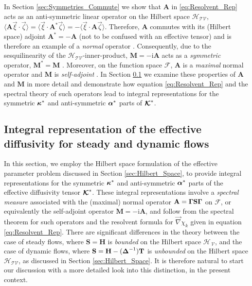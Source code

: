 \documentclass[11pt]{amsart}
\newcommand{\I}{\mathrm{i}}
\newcommand{\Mb}{\mathbf{M}}
\newcommand{\Tb}{\mathbf{T}}
\newcommand{\Hb}{\mathbf{H}}
\newcommand{\Sb}{\mathbf{S}}
\newcommand{\Ab}{\mathbf{A}}
\newcommand\Kbc{\mbox{\boldmath${\mathcal{K}}$}}
\newcommand{\Tc}{\mathcal{T}}
\newcommand{\Vc}{\mathcal{V}}
\newcommand{\Hs}{\mathscr{H}}
\newcommand{\Fs}{\mathscr{F}}
\newcommand\balpha{\mbox{\boldmath${\alpha}$}}
\newcommand\bDelta{\mbox{\boldmath${\Delta}$}}
\newcommand\bkappa{\mbox{\boldmath${\kappa}$}}
\newcommand\bGamma{\mbox{\boldmath${\Gamma}$}}
\begin{document}
In Section \ref{sec:Symmetries_Commute} we show that $\Ab$ in
\eqref{eq:Resolvent_Rep} acts as an anti-symmetric linear operator on
the Hilbert space $\Hs_{\Tc\Vc}$,
$\langle\Ab\vec{\xi}\cdot\vec{\zeta}\rangle=\langle\vec{\xi}\cdot\Ab^*\vec{\zeta}\rangle=-\langle\vec{\xi}\cdot\Ab\vec{\zeta}\rangle$. Therefore,
$\Ab$ commutes with its (Hilbert space) adjoint $\Ab^*=-\Ab$ (not to
be confused with an effective tensor) and is therefore an example of a
\emph{normal} operator \cite{Stone:64}. Consequently, due to the
sesquilinearity of the $\Hs_{\Tc\Vc}$-inner-product, $\Mb=-\I\Ab$ acts
as a \emph{symmetric} operator, $\Mb^*=\Mb$
\cite{Reed-1980,Stone:64}. Moreover, on the function space $\Fs$,
$\Ab$ is a \emph{maximal} normal operator and $\Mb$ is
\emph{self-adjoint} \cite{Stone:64}. In Section \ref{sec:Integral_Rep}
we examine these properties of $\Ab$ and $\Mb$ in more detail and
demonstrate how equation \eqref{eq:Resolvent_Rep} and the spectral
theory of such operators lead to integral representations for the
symmetric $\bkappa^*$ and anti-symmetric $\balpha^*$ parts of $\Kbc^*$.      








\subsection{Integral representation of the effective diffusivity
  for steady and dynamic flows}\label{sec:Integral_Rep}
%
In this section, we employ the Hilbert space formulation of the
effective parameter problem discussed in Section
\ref{sec:Hilbert_Space}, to provide integral representations for the
symmetric $\bkappa^*$ and anti-symmetric $\balpha^*$ parts of the
effective diffusivity tensor $\Kbc^*$. These integral representations
involve a \emph{spectral measure} associated with the 
(maximal) normal operator $\Ab=\bGamma\Sb\bGamma$ on
$\Fs$, or equivalently the self-adjoint operator
$\Mb=-\I\Ab$, and follow from the spectral theorem for such operators
\cite{Reed-1980,Stone:64} and the resolvent formula for $\vec{\nabla}\chi_k$
given in equation \eqref{eq:Resolvent_Rep}. There 
are significant differences in the theory between the case of steady 
flows, where $\Sb=\Hb$ is \emph{bounded} on the Hilbert space
$\Hs_{\,\Vc}$, and the case of dynamic flows, where
$\Sb=\Hb-(\bDelta^{-1})\Tb$ is \emph{unbounded} on the Hilbert space
$\Hs_{\Tc\Vc}$, as discussed in Section \ref{sec:Hilbert_Space}. It is
therefore natural to start our discussion with a more detailed look
into this distinction, in the present context.       
\end{document}
